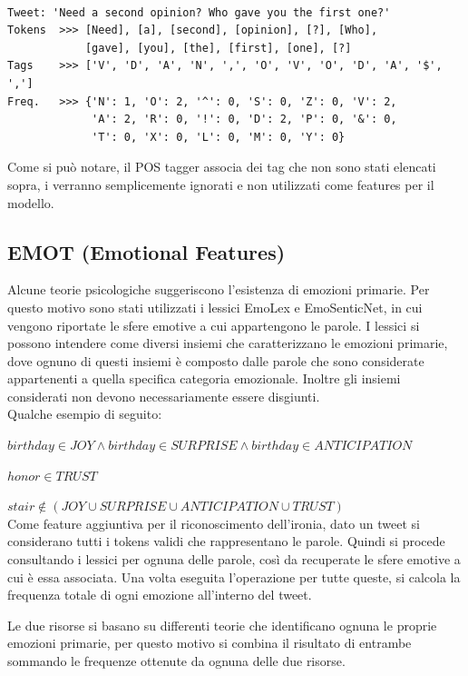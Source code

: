 \documentclass[oneside]{book}
\begin{document}
\begin{lstlisting}[caption={Esempio di tweet con POS tag associte.}]

Tweet: 'Need a second opinion? Who gave you the first one?'
Tokens  >>> [Need], [a], [second], [opinion], [?], [Who],
            [gave], [you], [the], [first], [one], [?]
Tags    >>> ['V', 'D', 'A', 'N', ',', 'O', 'V', 'O', 'D', 'A', '$', ',']
Freq.   >>> {'N': 1, 'O': 2, '^': 0, 'S': 0, 'Z': 0, 'V': 2,
             'A': 2, 'R': 0, '!': 0, 'D': 2, 'P': 0, '&': 0,
             'T': 0, 'X': 0, 'L': 0, 'M': 0, 'Y': 0}
\end{lstlisting}
Come si può notare, il POS tagger associa dei tag che non sono stati elencati sopra, i verranno semplicemente ignorati e non utilizzati come features per il modello. 

\subsection{EMOT (Emotional Features)}
Alcune teorie psicologiche suggeriscono l'esistenza di emozioni primarie. Per questo motivo sono stati utilizzati i lessici EmoLex e EmoSenticNet, in cui vengono riportate le sfere emotive a cui appartengono le parole.
I lessici si possono intendere come diversi insiemi che caratterizzano le emozioni primarie, dove ognuno di questi insiemi è composto dalle parole che sono considerate appartenenti a quella specifica categoria emozionale. Inoltre gli insiemi considerati non devono necessariamente essere disgiunti.\\
Qualche esempio di seguito:

$birthday \in JOY \land birthday \in SURPRISE \land birthday \in ANTICIPATION$

$honor \in TRUST$

$ stair \notin (JOY \cup SURPRISE \cup ANTICIPATION \cup TRUST) $\\


Come feature aggiuntiva per il riconoscimento dell'ironia, dato un tweet si considerano tutti i tokens validi che rappresentano le parole. Quindi si procede consultando i lessici per ognuna delle parole, così da recuperate le sfere emotive a cui è essa associata. Una volta eseguita l'operazione per tutte queste, si calcola la frequenza totale di ogni emozione all'interno del tweet.

Le due risorse si basano su differenti teorie che identificano ognuna le proprie emozioni primarie, per questo motivo si combina il risultato di entrambe sommando le frequenze ottenute da ognuna delle due risorse.
\end{document}
